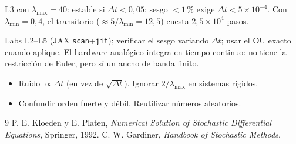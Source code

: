 \documentclass[11pt,a4paper]{article}
\begin{document}
\begin{ejemplo}
L3 con $\lambda_{\max}=40$: estable si $\Delta t<0{,}05$; sesgo $<1\,\%$ exige $\Delta t<5\times10^{-4}$. Con $\lambda_{\min}=0{,}4$, el
transitorio ($\approx5/\lambda_{\min}=12{,}5$) cuesta $2{,}5\times10^4$ pasos.
\end{ejemplo}

\begin{aplicacion}
Labs L2--L5 (JAX \texttt{scan}+\texttt{jit}); verificar el sesgo variando $\Delta t$; usar el OU exacto cuando aplique. El
hardware analógico integra en tiempo continuo: no tiene la restricción de Euler, pero sí un ancho de banda finito.
\end{aplicacion}

\begin{error}
\begin{itemize}[nosep]
\item Ruido $\propto\Delta t$ (en vez de $\sqrt{\Delta t}$). \quad Ignorar $2/\lambda_{\max}$ en sistemas rígidos.
\item Confundir orden fuerte y débil. \quad Reutilizar números aleatorios.
\end{itemize}
\end{error}

\begin{thebibliography}{9}\small
{} P. E. Kloeden y E. Platen, \emph{Numerical Solution of Stochastic Differential Equations}, Springer, 1992.
 C. W. Gardiner, \emph{Handbook of Stochastic Methods}.
\end{thebibliography}
\end{document}
